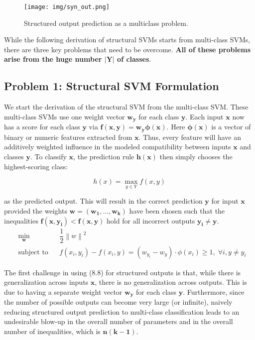 \documentclass[twoside]{article}
\newcommand{\norm}[1]{\left\lVert #1 \right\rVert}
\begin{document}
\begin{figure}[h]
\caption{Structured output prediction as a multiclass problem.}
\centering
\texttt{[image: img/syn\_out.png]}
\end{figure}

While the following derivation of structural SVMs
starts from multi-class SVMs, there are three key problems
that need to be overcome. \textbf{All of these problems arise from
the huge number $\mathbf{|Y|}$ of classes}. 
\newpage

\subsection{Problem 1: Structural SVM Formulation}
We start the derivation of the structural SVM from the multi-class SVM. These multi-class SVMs use one weight vector $\mathbf{w_{y}}$ for each class $\mathbf{y}$. Each input
$\mathbf{x}$ now has a score for each class $\mathbf{y}$ via $\mathbf{f(x,y) = w_{y} \phi(x)}$.
Here $\mathbf{\phi(x)}$ is a vector of binary or numeric features extracted
from $\mathbf{x}$. Thus, every feature will have an additively weighted
influence in the modeled compatibility between inputs $\mathbf{x}$ and
classes $\mathbf{y}$. To classify $\mathbf{x}$, the prediction rule $\mathbf{h(x)}$ then simply
chooses the highest-scoring class:

\begin{equation}
    h(x) = \max_{y \in Y} f(x,y)
\end{equation}

as the predicted output. This will result in the correct prediction $\mathbf{y}$ for input $\mathbf{x}$ provided the weights $\mathbf{w = (w_{1}, . . . , w_{k})}$
have been chosen such that the inequalities $\mathbf{f(x,y_{i}) < f(x, y)}$
hold for all incorrect outputs $\mathbf{y_{i} \not =  y}$. \\

\begin{equation}
\begin{aligned}
& \underset{\textbf{w}}{\text{min}}
& & \dfrac{1}{2} \norm{w}^2  \\
& \text{subject to}
& & f(x_{i},y_{i}) - f(x_{i},y) = (w_{y_i} - w_y)\cdot \phi(x_i) \geq 1 , \;\forall i, y \not = y_{i}
\end{aligned}
\end{equation}

The first challenge in using (8.8) for structured outputs is that, while there is generalization across inputs $\mathbf{x}$, there is no generalization across outputs. This is due to having a
separate weight vector $\mathbf{w_y}$ for each class $\mathbf{y}$. Furthermore,
since the number of possible outputs can become very large (or infinite), naively reducing structured output prediction
to multi-class classification leads to an undesirable blow-up
in the overall number of parameters and in the overall number of inequalities, which is $\mathbf{n(k-1)}$. \\
\end{document}
